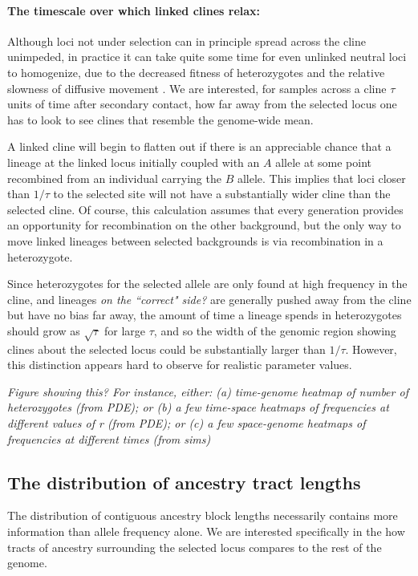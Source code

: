 \documentclass[11pt,letterpaper]{article}
\newcommand{\alisa}[1]{{\em \color{red} #1}}
\newcommand{\plr}[1]{{\em \color{blue} #1}}
\begin{document}
\paragraph{The timescale over which linked clines relax:}
Although loci not under selection can in principle spread across the cline unimpeded,
in practice it can take quite some time for even unlinked neutral loci to homogenize,
due to the decreased fitness of heterozygotes \citep{Barton1986}
and the relative slowness of diffusive movement \citep{Sedghifar2015}.
We are interested, for samples across a cline $\tau$ units of time after secondary contact, how far away from the selected locus one has to look to see clines that resemble the genome-wide mean.


A linked cline will begin to flatten out if there is an appreciable chance that a lineage at the linked locus initially coupled with an $A$ allele 
at some point recombined from an individual carrying the $B$ allele.
This implies that loci closer than $1/\tau$ to the selected site will not have a substantially wider cline than the selected cline.
Of course, this calculation assumes that every generation provides an opportunity for recombination on the other background, but the only way to move linked lineages between selected backgrounds is via recombination in a heterozygote. 

Since heterozygotes for the selected allele are only found at high frequency in the cline,
and lineages \alisa{on the ``correct" side?} are generally pushed away from the cline but have no bias far away,
the amount of time a lineage spends in heterozygotes should grow as $\sqrt{\tau}$ for large $\tau$,
and so the width of the genomic region showing clines about the selected locus could be 
substantially larger than $1/\tau$. However, this distinction appears hard to observe for realistic parameter values.



\plr{Figure showing this? 
    For instance, either: (a) time-genome heatmap of number of heterozygotes (from PDE);
    or (b) a few time-space heatmaps of frequencies at different values of r (from PDE);
    or (c) a few space-genome heatmaps of frequencies at different times (from sims)
}




\subsection*{The distribution of ancestry tract lengths}
The distribution of contiguous ancestry block lengths necessarily contains more information than allele frequency alone. We are interested specifically in the how tracts of ancestry surrounding the selected locus compares to the rest of the genome. 
\end{document}
